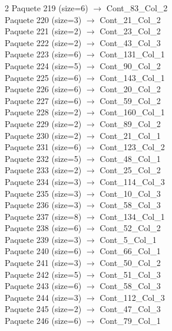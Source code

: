 \begin{multicols}{2}
Paquete 219 (size=6) $\rightarrow$ Cont\_83\_Col\_2\\
Paquete 220 (size=3) $\rightarrow$ Cont\_21\_Col\_2\\
Paquete 221 (size=2) $\rightarrow$ Cont\_23\_Col\_2\\
Paquete 222 (size=2) $\rightarrow$ Cont\_43\_Col\_3\\
Paquete 223 (size=6) $\rightarrow$ Cont\_131\_Col\_1\\
Paquete 224 (size=5) $\rightarrow$ Cont\_90\_Col\_2\\
Paquete 225 (size=6) $\rightarrow$ Cont\_143\_Col\_1\\
Paquete 226 (size=6) $\rightarrow$ Cont\_20\_Col\_2\\
Paquete 227 (size=6) $\rightarrow$ Cont\_59\_Col\_2\\
Paquete 228 (size=2) $\rightarrow$ Cont\_160\_Col\_1\\
Paquete 229 (size=2) $\rightarrow$ Cont\_89\_Col\_2\\
Paquete 230 (size=2) $\rightarrow$ Cont\_21\_Col\_1\\
Paquete 231 (size=6) $\rightarrow$ Cont\_123\_Col\_2\\
Paquete 232 (size=5) $\rightarrow$ Cont\_48\_Col\_1\\
Paquete 233 (size=2) $\rightarrow$ Cont\_25\_Col\_2\\
Paquete 234 (size=3) $\rightarrow$ Cont\_114\_Col\_3\\
Paquete 235 (size=3) $\rightarrow$ Cont\_10\_Col\_3\\
Paquete 236 (size=3) $\rightarrow$ Cont\_58\_Col\_3\\
Paquete 237 (size=8) $\rightarrow$ Cont\_134\_Col\_1\\
Paquete 238 (size=6) $\rightarrow$ Cont\_52\_Col\_2\\
Paquete 239 (size=3) $\rightarrow$ Cont\_5\_Col\_1\\
Paquete 240 (size=6) $\rightarrow$ Cont\_66\_Col\_1\\
Paquete 241 (size=3) $\rightarrow$ Cont\_50\_Col\_2\\
Paquete 242 (size=5) $\rightarrow$ Cont\_51\_Col\_3\\
Paquete 243 (size=6) $\rightarrow$ Cont\_58\_Col\_3\\
Paquete 244 (size=3) $\rightarrow$ Cont\_112\_Col\_3\\
Paquete 245 (size=2) $\rightarrow$ Cont\_47\_Col\_3\\
Paquete 246 (size=6) $\rightarrow$ Cont\_79\_Col\_1\\

\end{multicols}

